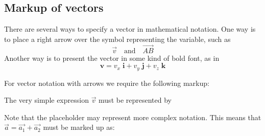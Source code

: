 \documentclass[english,a4paper,11pt]{article}
\begin{document}
\subsection{Markup of vectors}
There are several ways to specify a vector in mathematical notation. One way is to place a right arrow over the symbol representing the variable, such as 
\[
\vec{v}\quad \text{and}\quad \overrightarrow{AB}
\]
Another way is to present the vector in some kind of bold font, as in 
\[
\mathbf{v} = v_x\;  \mathbf{i} + v_y\; \mathbf{j} + v_z\;  \mathbf{k}
\]

\bigskip
For vector notation with arrows we require the following markup:
\begin{kodeblokk}
\end{kodeblokk}

\begin{eksempler}
The very simple expression $\vec{v}$ must be represented by
\begin{kodeblokk}
\end{kodeblokk}
 Note that the placeholder  may represent more complex notation. This means that $\vec{a} = \vec{a_1} + \vec{a_2}$ must be marked up as:
\begin{kodeblokk}
\end{kodeblokk}
\end{eksempler}
\end{document}
